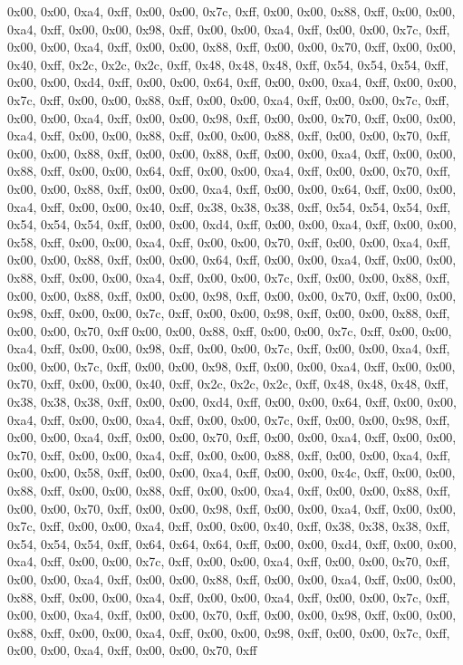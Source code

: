 0x00, 0x00, 0xa4, 0xff, 0x00, 0x00, 0x7c, 0xff, 0x00, 0x00, 0x88, 0xff, 0x00, 0x00, 0xa4, 0xff, 0x00, 0x00, 0x98, 0xff, 0x00, 0x00, 0xa4, 0xff, 0x00, 0x00, 0x7c, 0xff, 0x00, 0x00, 0xa4, 0xff, 0x00, 0x00, 0x88, 0xff, 0x00, 0x00, 0x70, 0xff, 0x00, 0x00, 0x40, 0xff, 0x2c, 0x2c, 0x2c, 0xff, 0x48, 0x48, 0x48, 0xff, 0x54, 0x54, 0x54, 0xff, 0x00, 0x00, 0xd4, 0xff, 0x00, 0x00, 0x64, 0xff, 0x00, 0x00, 0xa4, 0xff, 0x00, 0x00, 0x7c, 0xff, 0x00, 0x00, 0x88, 0xff, 0x00, 0x00, 0xa4, 0xff, 0x00, 0x00, 0x7c, 0xff, 0x00, 0x00, 0xa4, 0xff, 0x00, 0x00, 0x98, 0xff, 0x00, 0x00, 0x70, 0xff, 0x00, 0x00, 0xa4, 0xff, 0x00, 0x00, 0x88, 0xff, 0x00, 0x00, 0x88, 0xff, 0x00, 0x00, 0x70, 0xff, 0x00, 0x00, 0x88, 0xff, 0x00, 0x00, 0x88, 0xff, 0x00, 0x00, 0xa4, 0xff, 0x00, 0x00, 0x88, 0xff, 0x00, 0x00, 0x64, 0xff, 0x00, 0x00, 0xa4, 0xff, 0x00, 0x00, 0x70, 0xff, 0x00, 0x00, 0x88, 0xff, 0x00, 0x00, 0xa4, 0xff, 0x00, 0x00, 0x64, 0xff, 0x00, 0x00, 0xa4, 0xff, 0x00, 0x00, 0x40, 0xff, 0x38, 0x38, 0x38, 0xff, 0x54, 0x54, 0x54, 0xff, 0x54, 0x54, 0x54, 0xff, 0x00, 0x00, 0xd4, 0xff, 0x00, 0x00, 0xa4, 0xff, 0x00, 0x00, 0x58, 0xff, 0x00, 0x00, 0xa4, 0xff, 0x00, 0x00, 0x70, 0xff, 0x00, 0x00, 0xa4, 0xff, 0x00, 0x00, 0x88, 0xff, 0x00, 0x00, 0x64, 0xff, 0x00, 0x00, 0xa4, 0xff, 0x00, 0x00, 0x88, 0xff, 0x00, 0x00, 0xa4, 0xff, 0x00, 0x00, 0x7c, 0xff, 0x00, 0x00, 0x88, 0xff, 0x00, 0x00, 0x88, 0xff, 0x00, 0x00, 0x98, 0xff, 0x00, 0x00, 0x70, 0xff, 0x00, 0x00, 0x98, 0xff, 0x00, 0x00, 0x7c, 0xff, 0x00, 0x00, 0x98, 0xff, 0x00, 0x00, 0x88, 0xff, 0x00, 0x00, 0x70, 0xff
0x00, 0x00, 0x88, 0xff, 0x00, 0x00, 0x7c, 0xff, 0x00, 0x00, 0xa4, 0xff, 0x00, 0x00, 0x98, 0xff, 0x00, 0x00, 0x7c, 0xff, 0x00, 0x00, 0xa4, 0xff, 0x00, 0x00, 0x7c, 0xff, 0x00, 0x00, 0x98, 0xff, 0x00, 0x00, 0xa4, 0xff, 0x00, 0x00, 0x70, 0xff, 0x00, 0x00, 0x40, 0xff, 0x2c, 0x2c, 0x2c, 0xff, 0x48, 0x48, 0x48, 0xff, 0x38, 0x38, 0x38, 0xff, 0x00, 0x00, 0xd4, 0xff, 0x00, 0x00, 0x64, 0xff, 0x00, 0x00, 0xa4, 0xff, 0x00, 0x00, 0xa4, 0xff, 0x00, 0x00, 0x7c, 0xff, 0x00, 0x00, 0x98, 0xff, 0x00, 0x00, 0xa4, 0xff, 0x00, 0x00, 0x70, 0xff, 0x00, 0x00, 0xa4, 0xff, 0x00, 0x00, 0x70, 0xff, 0x00, 0x00, 0xa4, 0xff, 0x00, 0x00, 0x88, 0xff, 0x00, 0x00, 0xa4, 0xff, 0x00, 0x00, 0x58, 0xff, 0x00, 0x00, 0xa4, 0xff, 0x00, 0x00, 0x4c, 0xff, 0x00, 0x00, 0x88, 0xff, 0x00, 0x00, 0x88, 0xff, 0x00, 0x00, 0xa4, 0xff, 0x00, 0x00, 0x88, 0xff, 0x00, 0x00, 0x70, 0xff, 0x00, 0x00, 0x98, 0xff, 0x00, 0x00, 0xa4, 0xff, 0x00, 0x00, 0x7c, 0xff, 0x00, 0x00, 0xa4, 0xff, 0x00, 0x00, 0x40, 0xff, 0x38, 0x38, 0x38, 0xff, 0x54, 0x54, 0x54, 0xff, 0x64, 0x64, 0x64, 0xff, 0x00, 0x00, 0xd4, 0xff, 0x00, 0x00, 0xa4, 0xff, 0x00, 0x00, 0x7c, 0xff, 0x00, 0x00, 0xa4, 0xff, 0x00, 0x00, 0x70, 0xff, 0x00, 0x00, 0xa4, 0xff, 0x00, 0x00, 0x88, 0xff, 0x00, 0x00, 0xa4, 0xff, 0x00, 0x00, 0x88, 0xff, 0x00, 0x00, 0xa4, 0xff, 0x00, 0x00, 0xa4, 0xff, 0x00, 0x00, 0x7c, 0xff, 0x00, 0x00, 0xa4, 0xff, 0x00, 0x00, 0x70, 0xff, 0x00, 0x00, 0x98, 0xff, 0x00, 0x00, 0x88, 0xff, 0x00, 0x00, 0xa4, 0xff, 0x00, 0x00, 0x98, 0xff, 0x00, 0x00, 0x7c, 0xff, 0x00, 0x00, 0xa4, 0xff, 0x00, 0x00, 0x70, 0xff
